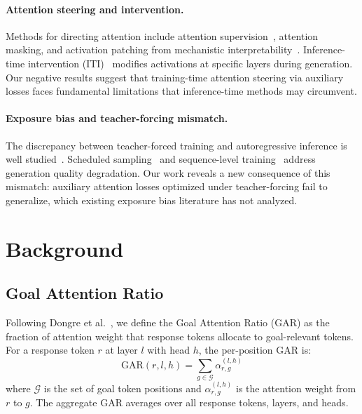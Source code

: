 \documentclass[11pt,a4paper]{article}
\newcommand{\gar}{\textsc{GAR}}
\begin{document}
\paragraph{Attention steering and intervention.}
Methods for directing attention include attention supervision~\cite{liu2016attention}, attention masking, and activation patching from mechanistic interpretability~\cite{vig2020investigating}.
Inference-time intervention (ITI)~\cite{li2024inference} modifies activations at specific layers during generation.
Our negative results suggest that training-time attention steering via auxiliary losses faces fundamental limitations that inference-time methods may circumvent.

\paragraph{Exposure bias and teacher-forcing mismatch.}
The discrepancy between teacher-forced training and autoregressive inference is well studied~\cite{ranzato2016sequence,bengio2015scheduled}.
Scheduled sampling~\cite{bengio2015scheduled} and sequence-level training~\cite{ranzato2016sequence} address generation quality degradation.
Our work reveals a new consequence of this mismatch: auxiliary attention losses optimized under teacher-forcing fail to generalize, which existing exposure bias literature has not analyzed.

\section{Background}
\label{sec:background}

\subsection{Goal Attention Ratio}

Following Dongre et al.~\cite{dongre2026}, we define the Goal Attention Ratio (\gar{}) as the fraction of attention weight that response tokens allocate to goal-relevant tokens.
For a response token $r$ at layer $l$ with head $h$, the per-position \gar{} is:
\begin{equation}
    \text{GAR}(r, l, h) = \sum_{g \in \mathcal{G}} \alpha_{r,g}^{(l,h)}
\end{equation}
where $\mathcal{G}$ is the set of goal token positions and $\alpha_{r,g}^{(l,h)}$ is the attention weight from $r$ to $g$.
The aggregate \gar{} averages over all response tokens, layers, and heads.
\end{document}
